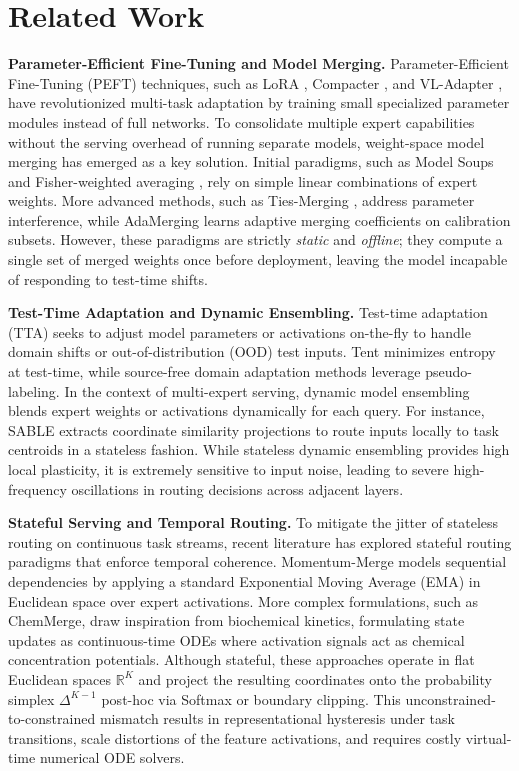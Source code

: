 \section{Related Work}
\label{sec:related}

\textbf{Parameter-Efficient Fine-Tuning and Model Merging.}
Parameter-Efficient Fine-Tuning (PEFT) techniques, such as LoRA \cite{hu2021lora}, Compacter \cite{karimi2022compacter}, and VL-Adapter \cite{sung2022vladapter}, have revolutionized multi-task adaptation by training small specialized parameter modules instead of full networks. To consolidate multiple expert capabilities without the serving overhead of running separate models, weight-space model merging has emerged as a key solution. Initial paradigms, such as Model Soups \cite{wortsman2022model} and Fisher-weighted averaging \cite{matena2021merging}, rely on simple linear combinations of expert weights. More advanced methods, such as Ties-Merging \cite{yadav2023ties}, address parameter interference, while AdaMerging \cite{adamerging} learns adaptive merging coefficients on calibration subsets. However, these paradigms are strictly \emph{static} and \emph{offline}; they compute a single set of merged weights once before deployment, leaving the model incapable of responding to test-time shifts.

\textbf{Test-Time Adaptation and Dynamic Ensembling.}
Test-time adaptation (TTA) seeks to adjust model parameters or activations on-the-fly to handle domain shifts or out-of-distribution (OOD) test inputs. Tent \cite{wang2020tent} minimizes entropy at test-time, while source-free domain adaptation methods \cite{liang2023source} leverage pseudo-labeling. In the context of multi-expert serving, dynamic model ensembling blends expert weights or activations dynamically for each query. For instance, SABLE \cite{wang2020tent} extracts coordinate similarity projections to route inputs locally to task centroids in a stateless fashion. While stateless dynamic ensembling provides high local plasticity, it is extremely sensitive to input noise, leading to severe high-frequency oscillations in routing decisions across adjacent layers.

\textbf{Stateful Serving and Temporal Routing.}
To mitigate the jitter of stateless routing on continuous task streams, recent literature has explored stateful routing paradigms that enforce temporal coherence. Momentum-Merge models sequential dependencies by applying a standard Exponential Moving Average (EMA) in Euclidean space over expert activations. More complex formulations, such as ChemMerge, draw inspiration from biochemical kinetics, formulating state updates as continuous-time ODEs where activation signals act as chemical concentration potentials. Although stateful, these approaches operate in flat Euclidean spaces $\mathbb{R}^K$ and project the resulting coordinates onto the probability simplex $\Delta^{K-1}$ post-hoc via Softmax or boundary clipping. This unconstrained-to-constrained mismatch results in representational hysteresis under task transitions, scale distortions of the feature activations, and requires costly virtual-time numerical ODE solvers.

